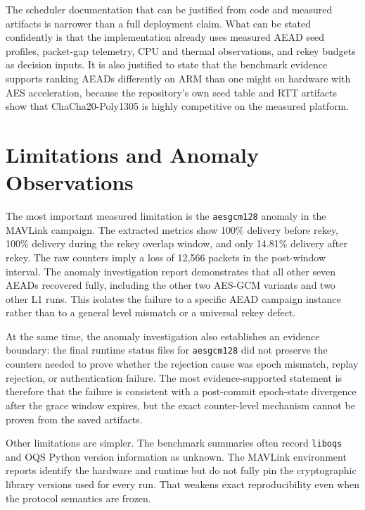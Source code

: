 \documentclass[11pt]{article}
\begin{document}
The scheduler documentation that can be justified from code and measured artifacts is narrower than a full deployment claim. What can be stated confidently is that the implementation already uses measured AEAD seed profiles, packet-gap telemetry, CPU and thermal observations, and rekey budgets as decision inputs. It is also justified to state that the benchmark evidence supports ranking AEADs differently on ARM than one might on hardware with AES acceleration, because the repository's own seed table and RTT artifacts show that ChaCha20-Poly1305 is highly competitive on the measured platform.

\section{Limitations and Anomaly Observations}
The most important measured limitation is the \texttt{aesgcm128} anomaly in the MAVLink campaign. The extracted metrics show 100\% delivery before rekey, 100\% delivery during the rekey overlap window, and only 14.81\% delivery after rekey. The raw counters imply a loss of 12,566 packets in the post-window interval. The anomaly investigation report demonstrates that all other seven AEADs recovered fully, including the other two AES-GCM variants and two other L1 runs. This isolates the failure to a specific AEAD campaign instance rather than to a general level mismatch or a universal rekey defect.

At the same time, the anomaly investigation also establishes an evidence boundary: the final runtime status files for \texttt{aesgcm128} did not preserve the counters needed to prove whether the rejection cause was epoch mismatch, replay rejection, or authentication failure. The most evidence-supported statement is therefore that the failure is consistent with a post-commit epoch-state divergence after the grace window expires, but the exact counter-level mechanism cannot be proven from the saved artifacts.

Other limitations are simpler. The benchmark summaries often record \texttt{liboqs} and OQS Python version information as unknown. The MAVLink environment reports identify the hardware and runtime but do not fully pin the cryptographic library versions used for every run. That weakens exact reproducibility even when the protocol semantics are frozen.
\end{document}
